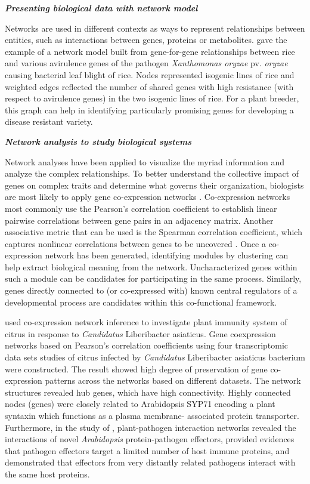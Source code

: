 \textit{\textbf{Presenting biological data with network model}}

Networks are used in different contexts as ways to represent relationships between entities, such as interactions between genes, proteins or metabolites. \citet{wu2007gene} gave the example of a network model built from gene-for-gene relationships between rice and various avirulence genes of the pathogen \textit{Xanthomonas oryzae} pv. \textit{oryzae} causing bacterial leaf blight of rice. Nodes represented isogenic lines of rice and weighted edges reflected the number of shared genes with high resistance (with respect to avirulence genes) in the two isogenic lines of rice. For a plant breeder, this graph can help in identifying particularly promising genes for developing a disease resistant variety.


\textit{\textbf{Network analysis to study biological systems}}

Network analyses have been applied to visualize the myriad information and analyze the complex relationships. To better understand the collective impact of genes on complex traits and determine what governs their organization, biologists are most likely to apply gene co-expression networks \citep{usadel2009co}. Co-expression networks most commonly use the Pearson's correlation coefficient to establish linear pairwise correlations between gene pairs in an adjacency matrix. Another associative metric that can be used is the Spearman correlation coefficient, which captures nonlinear correlations between genes to be uncovered \citep{usadel2009co, horvath2011weighted}. Once a co-expression network has been generated, identifying modules by clustering can help extract biological meaning from the network. Uncharacterized genes within such a module can be candidates for participating in the same process. Similarly, genes directly connected to (or co-expressed with) known central regulators of a developmental process are candidates within this co-functional framework.

\citet{Zheng2013} used co-expression network inference to investigate plant immunity system of citrus in response to \textit{Candidatus} Liberibacter asiaticus. Gene coexpression networks based on Pearson's correlation coefficients using four transcriptomic data sets studies of citrus infected by \textit{Candidatus} Liberibacter asiaticus bacterium were constructed. The result showed high degree of preservation of gene co-expression patterns across the networks based on different datasets. The network structures revealed hub genes, which have high connectivity. Highly connected nodes (genes) were closely related to Arabidopsis SYP71 encoding a plant syntaxin which functions as a plasma membrane- associated protein transporter. Furthermore, in the study of \citet{mukhtar2011independently}, plant-pathogen interaction networks revealed the interactions of novel \textit{Arabidopsis} protein-pathogen effectors, provided evidences that pathogen effectors target a limited number of host immune proteins, and demonstrated that effectors from very distantly related pathogens interact with the same host proteins. 

